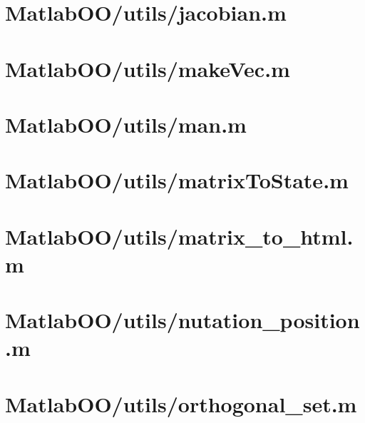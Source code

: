 \pagebreak
\section{MatlabOO/utils/jacobian.m}\label{code:MatlabOO/utils/jacobian.m}


\pagebreak
\section{MatlabOO/utils/makeVec.m}\label{code:MatlabOO/utils/makeVec.m}


\pagebreak
\section{MatlabOO/utils/man.m}\label{code:MatlabOO/utils/man.m}


\pagebreak
\section{MatlabOO/utils/matrixToState.m}\label{code:MatlabOO/utils/matrixToState.m}


\pagebreak
\section{MatlabOO/utils/matrix\_to\_html.m}\label{code:MatlabOO/utils/matrix_to_html.m}


\pagebreak
\section{MatlabOO/utils/nutation\_position.m}\label{code:MatlabOO/utils/nutation_position.m}


\pagebreak
\section{MatlabOO/utils/orthogonal\_set.m}\label{code:MatlabOO/utils/orthogonal_set.m}


